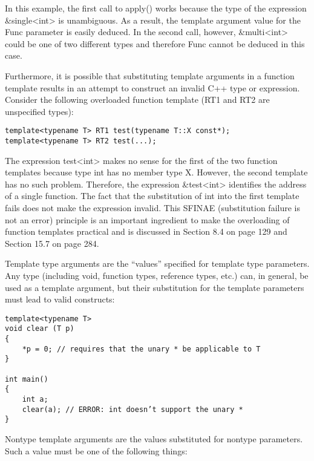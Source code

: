 In this example, the first call to apply() works because the type of the expression \&single<int> is unambiguous. As a result, the template argument value for the Func parameter is easily deduced. In the second call, however, \&multi<int> could be one of two different types and therefore Func cannot be deduced in this case.

Furthermore, it is possible that substituting template arguments in a function template results in an attempt to construct an invalid C++ type or expression. Consider the following overloaded function template (RT1 and RT2 are unspecified types):

\begin{lstlisting}[style=styleCXX]
template<typename T> RT1 test(typename T::X const*);
template<typename T> RT2 test(...);
\end{lstlisting}

The expression test<int> makes no sense for the first of the two function templates because type int has no member type X. However, the second template has no such problem. Therefore, the expression \&test<int> identifies the address of a single function. The fact that the substitution of int into the first template fails does not make the expression invalid. This SFINAE (substitution failure is not an error) principle is an important ingredient to make the overloading of function templates practical and is discussed in Section 8.4 on page 129 and Section 15.7 on page 284.


Template type arguments are the “values” specified for template type parameters. Any type (including void, function types, reference types, etc.) can, in general, be used as a template argument, but their substitution for the template parameters must lead to valid constructs:

\begin{lstlisting}[style=styleCXX]
template<typename T>
void clear (T p)
{
	*p = 0; // requires that the unary * be applicable to T
}

int main()
{
	int a;
	clear(a); // ERROR: int doesn’t support the unary *
}
\end{lstlisting}


Nontype template arguments are the values substituted for nontype parameters. Such a value must be one of the following things:

